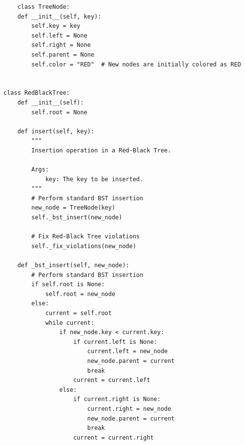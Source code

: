 \documentclass[12pt]{book} %
\begin{document}
\begin{lstlisting}
    class TreeNode:
    def __init__(self, key):
        self.key = key
        self.left = None
        self.right = None
        self.parent = None
        self.color = "RED"  # New nodes are initially colored as RED


class RedBlackTree:
    def __init__(self):
        self.root = None

    def insert(self, key):
        """
        Insertion operation in a Red-Black Tree.

        Args:
            key: The key to be inserted.
        """
        # Perform standard BST insertion
        new_node = TreeNode(key)
        self._bst_insert(new_node)

        # Fix Red-Black Tree violations
        self._fix_violations(new_node)

    def _bst_insert(self, new_node):
        # Perform standard BST insertion
        if self.root is None:
            self.root = new_node
        else:
            current = self.root
            while current:
                if new_node.key < current.key:
                    if current.left is None:
                        current.left = new_node
                        new_node.parent = current
                        break
                    current = current.left
                else:
                    if current.right is None:
                        current.right = new_node
                        new_node.parent = current
                        break
                    current = current.right


\end{lstlisting}
\end{document}
